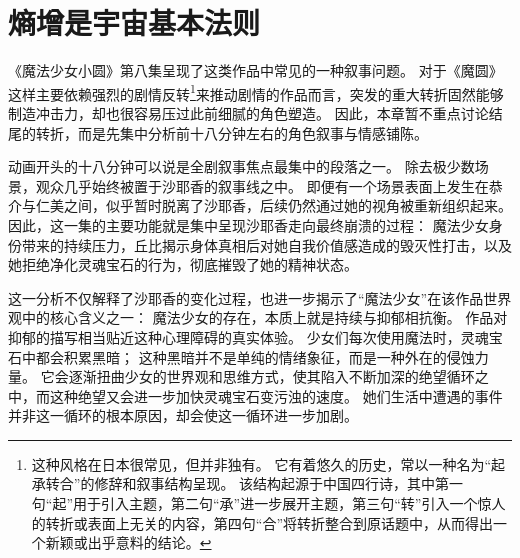 \chapter[熵增是宇宙基本法则]{熵增是宇宙基本法则}


《魔法少女小圆》第八集呈现了这类作品中常见的一种叙事问题。
对于《魔圆》这样主要依赖强烈的剧情反转\footnote{%
    这种风格在日本很常见，但并非独有。
    它有着悠久的历史，常以一种名为“起承转合”的修辞和叙事结构呈现。
    该结构起源于中国四行诗，其中第一句“起”用于引入主题，第二句“承”进一步展开主题，第三句“转”引入一个惊人的转折或表面上无关的内容，第四句“合”将转折整合到原话题中，从而得出一个新颖或出乎意料的结论。
}来推动剧情的作品而言，突发的重大转折固然能够制造冲击力，却也很容易压过此前细腻的角色塑造。
因此，本章暂不重点讨论结尾的转折，而是先集中分析前十八分钟左右的角色叙事与情感铺陈。

动画开头的十八分钟可以说是全剧叙事焦点最集中的段落之一。
除去极少数场景，观众几乎始终被置于沙耶香的叙事线之中。
即便有一个场景表面上发生在恭介与仁美之间，似乎暂时脱离了沙耶香，后续仍然通过她的视角被重新组织起来。
因此，这一集的主要功能就是集中呈现沙耶香走向最终崩溃的过程：
魔法少女身份带来的持续压力，丘比揭示身体真相后对她自我价值感造成的毁灭性打击，以及她拒绝净化灵魂宝石的行为，彻底摧毁了她的精神状态。

这一分析不仅解释了沙耶香的变化过程，也进一步揭示了“魔法少女”在该作品世界观中的核心含义之一：
魔法少女的存在，本质上就是持续与抑郁相抗衡。
作品对抑郁的描写相当贴近这种心理障碍的真实体验。
少女们每次使用魔法时，灵魂宝石中都会积累黑暗；
这种黑暗并不是单纯的情绪象征，而是一种外在的侵蚀力量。
它会逐渐扭曲少女的世界观和思维方式，使其陷入不断加深的绝望循环之中，而这种绝望又会进一步加快灵魂宝石变污浊的速度。
她们生活中遭遇的事件并非这一循环的根本原因，却会使这一循环进一步加剧\cite{ref44}。


